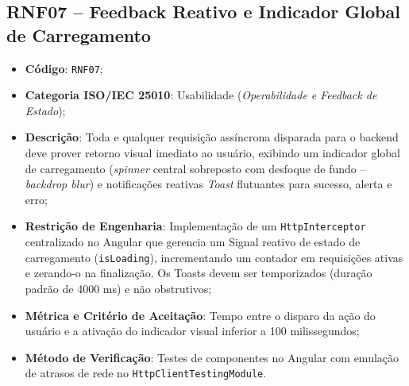 \subsection{RNF07 -- Feedback Reativo e Indicador Global de Carregamento}
\begin{itemize}
    \item \textbf{Código}: \texttt{RNF07};
    \item \textbf{Categoria ISO/IEC 25010}: Usabilidade (\textit{Operabilidade e Feedback de Estado});
    \item \textbf{Descrição}: Toda e qualquer requisição assíncrona disparada para o backend deve prover retorno visual imediato ao usuário, exibindo um indicador global de carregamento (\textit{spinner} central sobreposto com desfoque de fundo -- \textit{backdrop blur}) e notificações reativas \textit{Toast} flutuantes para sucesso, alerta e erro;
    \item \textbf{Restrição de Engenharia}: Implementação de um \texttt{HttpInterceptor} centralizado no Angular que gerencia um Signal reativo de estado de carregamento (\texttt{isLoading}), incrementando um contador em requisições ativas e zerando-o na finalização. Os Toasts devem ser temporizados (duração padrão de 4000 ms) e não obstrutivos;
    \item \textbf{Métrica e Critério de Aceitação}: Tempo entre o disparo da ação do usuário e a ativação do indicador visual inferior a 100 milissegundos;
    \item \textbf{Método de Verificação}: Testes de componentes no Angular com emulação de atrasos de rede no \texttt{HttpClientTestingModule}.
\end{itemize}

